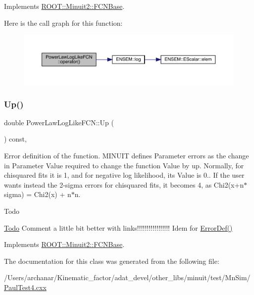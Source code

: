 Implements \mbox{\hyperlink{classROOT_1_1Minuit2_1_1FCNBase_ae4a86bd94d0d0f5ca6fc8f8ab2bb43cd}{R\+O\+O\+T\+::\+Minuit2\+::\+F\+C\+N\+Base}}.

Here is the call graph for this function\+:\nopagebreak
\begin{figure}[H]
\begin{center}
\leavevmode
\includegraphics[width=350pt]{dc/d0f/classPowerLawLogLikeFCN_a279b7010b6b252d0772e5d561f749386_cgraph}
\end{center}
\end{figure}
\mbox{\label{classPowerLawLogLikeFCN_ae1700e7288ed461d0e3354a2f2c5ea6a}} 
\subsubsection{\texorpdfstring{Up()}{Up()}}
{\footnotesize\ttfamily double Power\+Law\+Log\+Like\+F\+C\+N\+::\+Up (\begin{DoxyParamCaption}{ }\end{DoxyParamCaption}) const\hspace{0.3cm}{\ttfamily [inline]}, {\ttfamily [virtual]}}

Error definition of the function. M\+I\+N\+U\+IT defines Parameter errors as the change in Parameter Value required to change the function Value by up. Normally, for chisquared fits it is 1, and for negative log likelihood, its Value is 0.. If the user wants instead the 2-\/sigma errors for chisquared fits, it becomes 4, as Chi2(x+n$\ast$sigma) = Chi2(x) + n$\ast$n.

\begin{DoxyRefDesc}{Todo}
\item[\mbox{\hyperlink{todo__todo000001}{Todo}}]Comment a little bit better with links!!!!!!!!!!!!!!!!! Idem for \mbox{\hyperlink{classROOT_1_1Minuit2_1_1FCNBase_ac4592475c58a65b037ba97ab5f3cba10}{Error\+Def()}}\end{DoxyRefDesc}


Implements \mbox{\hyperlink{classROOT_1_1Minuit2_1_1FCNBase_a04ef08ddad92ce8d89d498efbe021c39}{R\+O\+O\+T\+::\+Minuit2\+::\+F\+C\+N\+Base}}.



The documentation for this class was generated from the following file\+:\begin{DoxyCompactItemize}
\item 
/\+Users/archanar/\+Kinematic\+\_\+factor/adat\+\_\+devel/other\+\_\+libs/minuit/test/\+Mn\+Sim/\mbox{\hyperlink{PaulTest4_8cxx}{Paul\+Test4.\+cxx}}\end{DoxyCompactItemize}
